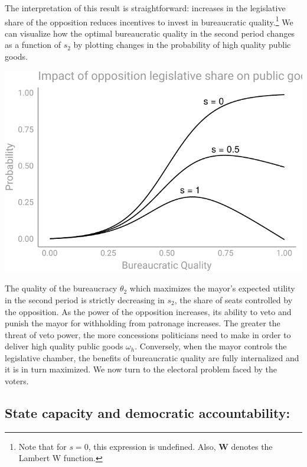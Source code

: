 \documentclass[12pt,]{article}
\let\rmarkdownfootnote\footnote%
\def\footnote{\protect\rmarkdownfootnote}
\begin{document}
The interpretation of this result is straightforward: increases in the
legislative share of the opposition reduces incentives to invest in
bureaucratic quality.\footnote{Note that for \(s=0\), this expression is
  undefined. Also, \(\boldsymbol{W}\) denotes the Lambert W function.}
We can visualize how the optimal bureaucratic quality in the second
period changes as a function of \(s_2\) by plotting changes in the
probability of high quality public goods.

\begin{center}\includegraphics{dissertation_files/figure-latex/visualization-1} \end{center}

The quality of the bureaucracy \(\theta_2\) which maximizes the mayor's
expected utility in the second period is strictly decreasing in \(s_2\),
the share of seats controlled by the opposition. As the power of the
opposition increases, its ability to veto and punish the mayor for
withholding from patronage increases. The greater the threat of veto
power, the more concessions politicians need to make in order to deliver
high quality public goods \(\omega_h\). Conversely, when the mayor
controls the legislative chamber, the benefits of bureaucratic quality
are fully internalized and it is in turn maximized. We now turn to the
electoral problem faced by the voters.

\hypertarget{state-capacity-and-democratic-accountability}{%
\subsection{State capacity and democratic
accountability:}\label{state-capacity-and-democratic-accountability}}
\end{document}
